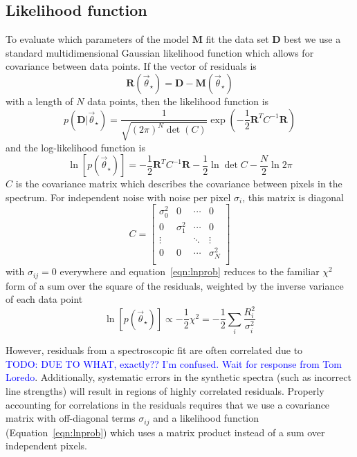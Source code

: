 \documentclass[iop,floatfix]{emulateapj}
\newcommand{\vt}{\vec{\theta}}
\newcommand{\vstar}{\vt_{\star}}
\newcommand{\fM}{ {\bm M}}
\newcommand{\fD}{ {\bm D}}
\newcommand{\fR}{ {\bm R}}
\newcommand{\todo}[1]{ \textcolor{Blue}{\\TODO: #1}}
\begin{document}
\subsection{Likelihood function}
To evaluate which parameters of the model $\fM$ fit the data set $\fD$ best we
 use a standard multidimensional Gaussian likelihood function which allows for
 covariance between data points. 
If the vector of residuals is 
\begin{equation}
  \fR(\vstar) = \fD - \fM(\vstar)
\end{equation}
 with a length of $N$ data points, then the likelihood function is
\begin{equation}
  p(\fD | \vstar) = \frac{1}{\sqrt{(2 \pi)^N \det(C)}} \exp\left ( -\frac{1}{2}
   \fR^T C^{-1} \fR \right ) 
\end{equation}
 and the log-likelihood function is
\begin{equation}
  \ln[p(\vstar)] = -\frac{1}{2} \fR^T C^{-1} \fR - \frac{1}{2} \ln \det C  
   - \frac{N}{2} \ln 2 \pi 
  \label{eqn:lnprob}
\end{equation}
$C$ is the covariance matrix which describes the covariance between pixels in
 the spectrum. 
For independent noise with noise per pixel $\sigma_i$, this matrix is diagonal
\begin{equation}
  C = 
  \begin{bmatrix}
    \sigma_0^2 & 0  & \cdots & 0\\
    0 & \sigma_1^2 & \cdots & 0\\
    \vdots  &   & \ddots  & \vdots \\
    0 & 0 & \cdots & \sigma_N^2\\
  \end{bmatrix}
  \label{eqn:covariance_diagonal}
\end{equation}
with $\sigma_{ij} = 0$ everywhere and equation~\ref{eqn:lnprob} reduces to the
 familiar $\chi^2$ form of a sum over the square of the residuals, weighted by
 the inverse variance of each data point
\begin{equation}
  \ln[p(\vstar)] \propto - \frac{1}{2} \chi^2 = - \frac{1}{2} \sum_i
   \frac{R_i^2}{\sigma_i^2}
\end{equation}

However, residuals from a spectroscopic fit are often correlated due to
 \todo{DUE TO WHAT, exactly?? I'm confused. 
Wait for response from Tom Loredo}. 
Additionally, systematic errors in the synthetic spectra (such as incorrect
 line strengths) will result in regions of highly correlated residuals. 
Properly accounting for correlations in the residuals requires that we use a
 covariance matrix with off-diagonal terms $\sigma_{ij}$ and a likelihood
 function (Equation~\ref{eqn:lnprob}) which uses a matrix product instead of a
 sum over independent pixels.
\end{document}
